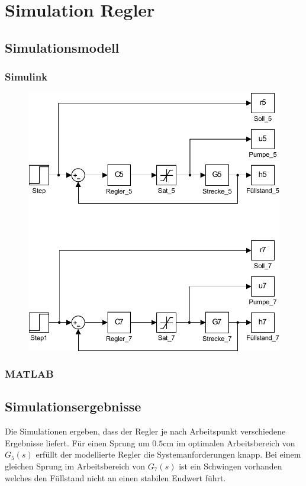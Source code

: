 \section{Simulation Regler}

\subsection{Simulationsmodell}

\subsubsection{Simulink}
\begin{figure}[h!]
	\centering
	\includegraphics[scale=0.8]{11/model.pdf}
\end{figure}

\subsubsection{MATLAB}



\subsection{Simulationsergebnisse}
Die Simulationen ergeben, dass der Regler je nach Arbeitspunkt verschiedene
Ergebnisse liefert. Für einen Sprung um $0.5\si{\centi\meter}$ im optimalen
Arbeitsbereich von $G_5(s)$ erfüllt der modellierte Regler die
Systemanforderungen knapp. Bei einem gleichen Sprung im Arbeitsbereich
von $G_7(s)$ ist ein Schwingen vorhanden welches den Füllstand nicht
an einen stabilen Endwert führt.

